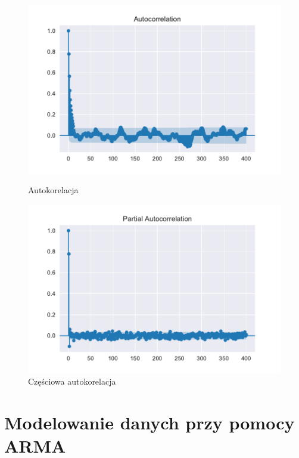 \documentclass{article}
\theoremstyle{break}
\begin{document}
	\begin{figure}[H]
		\begin{center}
			\begin{minipage}{0.49\linewidth}
				\centering
				\includegraphics[scale=0.49]{acf2.pdf}
				\caption{Autokorelacja}
				\label{fig:acf2}
			\end{minipage}
			\begin{minipage}{0.49\linewidth}
				\centering
				\includegraphics[scale=0.49]{pacf2.pdf}
				\caption{Częściowa autokorelacja}
				\label{fig:pacf2}
			\end{minipage}
		\end{center}
	\end{figure}
	
	\section{Modelowanie danych przy pomocy ARMA}
	
\end{document}
